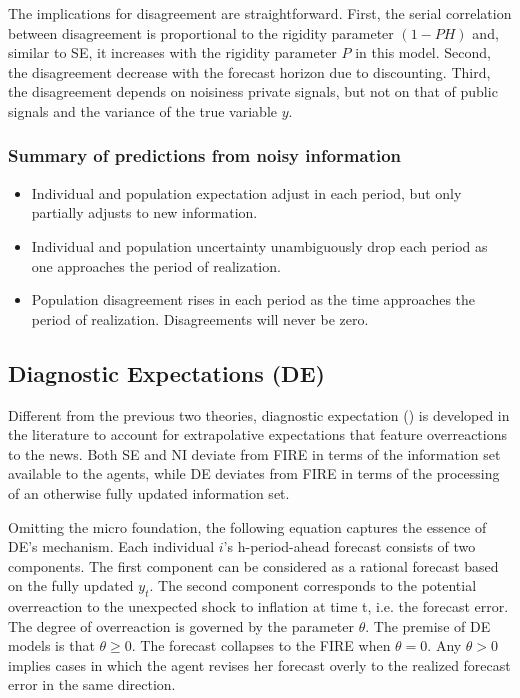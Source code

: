 \documentclass[12pt]{article}
\begin{document}
	The implications for disagreement are straightforward. First, the serial correlation between disagreement is proportional to the rigidity parameter $(1-PH)$ and, similar to SE, it increases with the rigidity parameter $P$ in this model. Second, the disagreement decrease with the forecast horizon due to discounting. Third, the disagreement depends on noisiness private signals, but not on that of public signals and the variance of the true variable $y$. 
	
	\subsubsection{Summary of predictions from noisy information}
	
	\begin{itemize}
		\item Individual and population expectation adjust in each period, but only partially adjusts to new information. 
		\item  Individual and population uncertainty unambiguously drop each period as one approaches the period of realization.  
		\item  Population disagreement rises in each period as the time approaches the period of realization. Disagreements will never be zero. 
	\end{itemize}
	
	\subsection{Diagnostic Expectations (DE)}
	
	Different from the previous two theories, diagnostic expectation (\cite{bordalo2018diagnostic}) is developed in the literature to account for extrapolative expectations that feature overreactions to the news. Both SE and NI deviate from FIRE in terms of the information set available to the agents, while DE deviates from FIRE in terms of the processing of an otherwise fully updated information set. 		

Omitting the micro foundation, the following equation captures the essence of DE's mechanism. Each individual $i$'s h-period-ahead forecast consists of two components. The first component can be considered as a rational forecast based on the fully updated $y_t$. The second component corresponds to the potential overreaction to the unexpected shock to inflation at time t, i.e. the forecast error. The degree of overreaction is governed by the parameter $\theta$. The premise of DE models is that $\theta \geq 0$. The forecast collapses to the FIRE when $\theta = 0$. Any $\theta>0$ implies cases in which the agent revises her forecast overly to the realized forecast error in the same direction.
\end{document}
